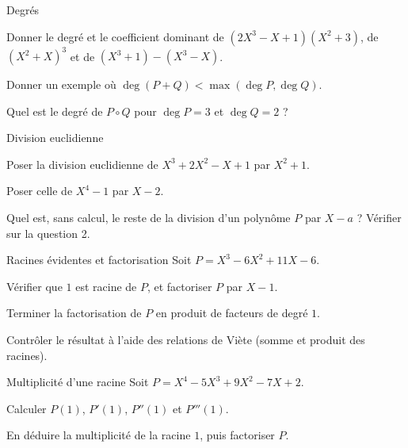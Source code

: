 \exercices
{}

\begin{exercice}[1]{Degrés}
\begin{questions}
  \item Donner le degré et le coefficient dominant de
    $(2X^{3}-X+1)(X^{2}+3)$, de $(X^{2}+X)^{3}$ et de
    $(X^{3}+1)-(X^{3}-X)$.
  \item Donner un exemple où $\deg(P+Q)<\max(\deg P,\deg Q)$.
  \item Quel est le degré de $P\circ Q$ pour $\deg P=3$ et $\deg Q=2$ ?
\end{questions}
\end{exercice}

\begin{exercice}[1]{Division euclidienne}
\begin{questions}
  \item Poser la division euclidienne de $X^{3}+2X^{2}-X+1$ par
    $X^{2}+1$.
  \item Poser celle de $X^{4}-1$ par $X-2$.
  \item Quel est, sans calcul, le reste de la division d'un polynôme $P$
    par $X-a$ ? Vérifier sur la question 2.
\end{questions}
\end{exercice}

\begin{exercice}[1]{Racines évidentes et factorisation}
Soit $P=X^{3}-6X^{2}+11X-6$.
\begin{questions}
  \item Vérifier que $1$ est racine de $P$, et factoriser $P$ par $X-1$.
  \item Terminer la factorisation de $P$ en produit de facteurs de degré
    $1$.
  \item Contrôler le résultat à l'aide des relations de Viète (somme et
    produit des racines).
\end{questions}
\end{exercice}

\begin{exercice}[1]{Multiplicité d'une racine}
Soit $P=X^{4}-5X^{3}+9X^{2}-7X+2$.
\begin{questions}
  \item Calculer $P(1)$, $P'(1)$, $P''(1)$ et $P'''(1)$.
  \item En déduire la multiplicité de la racine $1$, puis factoriser $P$.
\end{questions}
\end{exercice}

